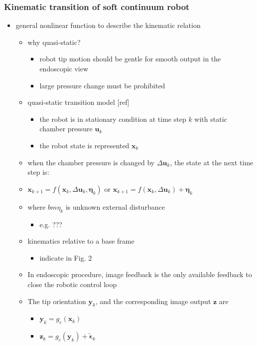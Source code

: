 \documentclass[journal,onecolumn]{IEEEtran}
\begin{document}
\subsubsection{Kinematic transition of soft continuum robot}
\label{sec:org27c0e68}
\begin{itemize}
\item general nonlinear function to describe the kinematic relation
\begin{itemize}
\item why quasi-static?
\begin{itemize}
\item robot tip motion should be gentle for smooth output in the endoscopic view
\item large pressure change must be prohibited
\end{itemize}
\item quasi-static transition model [ref]
\begin{itemize}
\item the robot is in stationary condition at time step \(k\) with static chamber pressure \(\bm{u}_k\)
\item the robot state is represented \(\bm{x}_k\)
\end{itemize}
\item when the chamber pressure is changed by \(\Delta\bm{u}_k\), the state at the next time step is:
\item \(\bm{x}_{k+1} = f(\bm{x}_k,\Delta\bm{u}_k, \bm{\eta}_k)\) or \(\bm{x}_{k+1} = f(\bm{x}_k,\Delta\bm{u}_k) + \bm{\eta}_k\)
\item where \(bm{\eta}_k\) is unknown external disturbance
\begin{itemize}
\item e.g. ???
\end{itemize}
\item kinematics relative to a base frame
\begin{itemize}
\item indicate in Fig. 2
\end{itemize}
\item In endoscopic procedure, image feedback is the only available feedback to close the robotic control loop
\item The tip orientation \(\bm{y}_k\), and the corresponding image output \(\bm{z}\) are 
\begin{itemize}
\item \(\bm{y}_k = g_e(\bm{x}_k)\)
\item \(\bm{z}_k = g_c(\bm{y}_k) + \bm{\tilde \epsilon}_k\)

\end{itemize}
\end{itemize}
\end{itemize}
\end{document}
